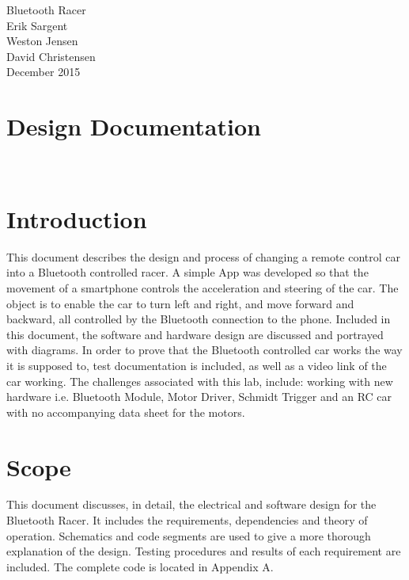 \documentclass[12pt]{article}
\begin{document}
\begin{titlepage}
\vspace*{\fill}
\begin {center}
\Huge Bluetooth Racer\\


\Large Erik Sargent\\
\Large Weston Jensen\\
\Large David Christensen\\
December 2015\\
\end {center}
\vspace*{\fill}

\end{titlepage}


\tableofcontents
\listoffigures
\listoftables
\newpage

\section{Design Documentation}

\

\section{Introduction}

This document describes the design and process of changing a remote control car into a Bluetooth controlled racer. A simple App was developed so that the movement of a smartphone controls the acceleration and steering of the car. The object is to enable the car to turn left and right, and move forward and backward, all controlled by the Bluetooth connection to the phone. Included in this document, the software and hardware design are discussed and portrayed with diagrams. In order to prove that the Bluetooth controlled car works the way it is supposed to, test documentation is included, as well as a video link of the car working. The challenges associated with this lab, include: working with new hardware i.e. Bluetooth Module, Motor Driver, Schmidt Trigger and an RC car with no accompanying data sheet for the motors.\\

\section{Scope}
This document discusses, in detail, the electrical and software design for the Bluetooth Racer. It includes the requirements, dependencies and theory of operation. Schematics and code segments are used to give a more thorough explanation of the design. Testing procedures and results of each requirement are included. The complete code is located in Appendix A.\\
\end{document}
